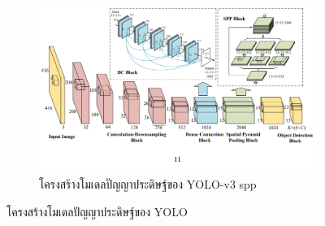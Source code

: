 \begin{figure}[!ht]
\begin{subfigure}[b]{0.5\textwidth}
        \includegraphics[width=\textwidth]{chapter2/images/yolo_spp.png}
	 \caption[โครงสร้างโมเดลปัญญาประดิษฐ์ของ YOLO-v3 spp]{โครงสร้างโมเดลปัญญาประดิษฐ์ของ YOLO-v3 spp\textsuperscript{\cite{spp_pic}}}
       \label{fig:spp}
    \end{subfigure}
    \caption{โครงสร้างโมเดลปัญญาประดิษฐ์ของ YOLO}
    \label{fig:yolo-architecture}
\end{figure}

